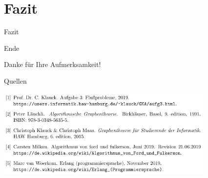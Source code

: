 \documentclass{beamer}
\begin{document}
    \section{Fazit}
    \begin{frame}{Fazit}

    \end{frame}

    \begin{frame}{Ende}
        \begin{center}
            Danke f\"ur Ihre Aufmerksamkeit!
        \end{center}
    \end{frame}

    \begin{frame}{Quellen}
        \begin{center}
            \includegraphics[height=4.4cm]{../quellen.PNG}
        \end{center}
    \end{frame}
\end{document}
